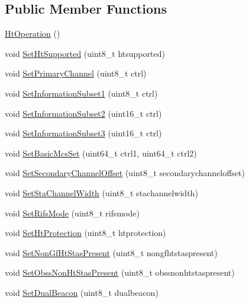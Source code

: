 \subsection*{Public Member Functions}
\begin{DoxyCompactItemize}
\item 
\hyperlink{classns3_1_1HtOperation_a0233519904a3e15ee570503fd900192b}{Ht\+Operation} ()
\item 
void \hyperlink{classns3_1_1HtOperation_a237b1e70498c8dacb7094f761ea32f2c}{Set\+Ht\+Supported} (uint8\+\_\+t htsupported)
\item 
void \hyperlink{classns3_1_1HtOperation_adcd8396b0ba4f3d4785b7d216f9ed6a8}{Set\+Primary\+Channel} (uint8\+\_\+t ctrl)
\item 
void \hyperlink{classns3_1_1HtOperation_acd15dd8bef697131b9b20a2c2d8ed3de}{Set\+Information\+Subset1} (uint8\+\_\+t ctrl)
\item 
void \hyperlink{classns3_1_1HtOperation_a3a42a000cc9f1a523866f5acc51c6c61}{Set\+Information\+Subset2} (uint16\+\_\+t ctrl)
\item 
void \hyperlink{classns3_1_1HtOperation_a56b27bf883204f5e1a805ea5f5e46a0b}{Set\+Information\+Subset3} (uint16\+\_\+t ctrl)
\item 
void \hyperlink{classns3_1_1HtOperation_a27b2f345add6f6243a4e34fdad088bc5}{Set\+Basic\+Mcs\+Set} (uint64\+\_\+t ctrl1, uint64\+\_\+t ctrl2)
\item 
void \hyperlink{classns3_1_1HtOperation_af8847428b09308d8585d219b3851863b}{Set\+Secondary\+Channel\+Offset} (uint8\+\_\+t secondarychanneloffset)
\item 
void \hyperlink{classns3_1_1HtOperation_a10ca687cf11edb77e9f5f31423637474}{Set\+Sta\+Channel\+Width} (uint8\+\_\+t stachannelwidth)
\item 
void \hyperlink{classns3_1_1HtOperation_a7edc60faeaa83250e4c7450ca1642d1a}{Set\+Rifs\+Mode} (uint8\+\_\+t rifsmode)
\item 
void \hyperlink{classns3_1_1HtOperation_af8e9b520dbf1dcb02540a523894d0924}{Set\+Ht\+Protection} (uint8\+\_\+t htprotection)
\item 
void \hyperlink{classns3_1_1HtOperation_a79f953a8c2dc5f065970ba72e68c0208}{Set\+Non\+Gf\+Ht\+Stas\+Present} (uint8\+\_\+t nongfhtstaspresent)
\item 
void \hyperlink{classns3_1_1HtOperation_aae70f5df005db30b14cca9f07ca9ba9f}{Set\+Obss\+Non\+Ht\+Stas\+Present} (uint8\+\_\+t obssnonhtstaspresent)
\item 
void \hyperlink{classns3_1_1HtOperation_ad40db24d9c20926f463e444395780827}{Set\+Dual\+Beacon} (uint8\+\_\+t dualbeacon)

\end{DoxyCompactItemize}
